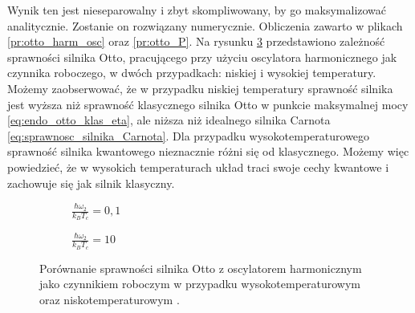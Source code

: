 Wynik ten jest nieseparowalny i zbyt skompliwowany, by go maksymalizować analitycznie. Zostanie on rozwiązany numerycznie. Obliczenia zawarto w plikach \ref{pr:otto_harm_osc} oraz \ref{pr:otto_P}. Na rysunku \ref{fig:otto_harm_osc_PT} przedstawiono zależność sprawności silnika Otto, pracującego przy użyciu oscylatora harmonicznego jak czynnika roboczego, w dwóch przypadkach: niskiej i wysokiej temperatury. Możemy zaobserwować, że w przypadku niskiej temperatury sprawność silnika jest wyższa niż sprawność klasycznego silnika Otto w punkcie maksymalnej mocy \eqref{eq:endo_otto_klas_eta}, ale niższa niż idealnego silnika Carnota \eqref{eq:sprawnosc_silnika_Carnota}. Dla przypadku wysokotemperaturowego sprawność silnika kwantowego nieznacznie różni się od klasycznego. Możemy więc powiedzieć, że w wysokich temperaturach układ traci swoje cechy kwantowe i zachowuje się jak silnik klasyczny.

\begin{figure}[h]
	\centering
	\begin{subfigure}{0.45\textwidth}
		\centering
		
		\caption{\(\frac{\hbar\omega_2}{k_B T_c} = 0,1\)}
		\label{fig:otto_harm_osc_PT_01}
	\end{subfigure}
	\begin{subfigure}{0.45\textwidth}
		\centering
		
		\caption{\(\frac{\hbar\omega_2}{k_B T_c} = 10\)}
		\label{fig:otto_harm_osc_PT_10}
	\end{subfigure}
	\captionsetup{subrefformat=parens}
	\caption{Porównanie sprawności silnika Otto z oscylatorem harmonicznym jako czynnikiem roboczym w przypadku wysokotemperaturowym  oraz niskotemperaturowym .}
	\label{fig:otto_harm_osc_PT}
\end{figure}

